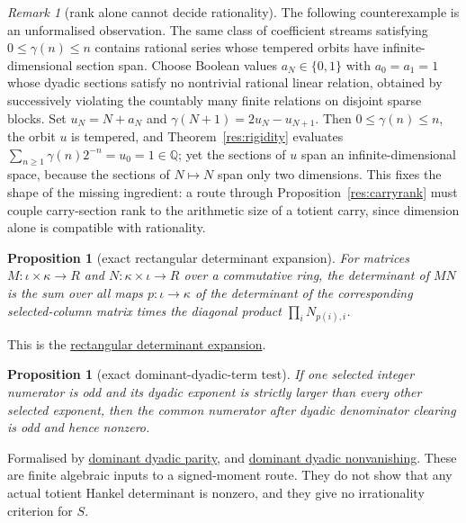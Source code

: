 \documentclass[11pt]{article}
\newcommand{\commit}{ebc98ee71f6819bd9fe344a0bb343542c604e533}
\newcommand{\repobase}{https://github.com/wcook04/plectis-lean-erdos249-257/blob/\commit}
\newcommand{\PK}{Erdos249257}
\newcommand{\lword}[4]{\href{\repobase/\PK/#1\#L#2}{#4}}
\newtheorem{proposition}[theorem]{Proposition}
\theoremstyle{definition}
\theoremstyle{remark}
\newtheorem*{remark}{Remark}
\newcommand{\Q}{\mathbb{Q}}
\begin{document}
{\begin{remark}[rank alone cannot decide rationality]
The following counterexample is an unformalised observation.  The same class
of coefficient streams satisfying $0\leq\gamma(n)\leq n$ contains rational
series whose tempered orbits have
infinite-dimensional section span.  Choose Boolean values
\(a_N\in\{0,1\}\) with \(a_0=a_1=1\) whose dyadic sections satisfy no
nontrivial rational linear relation, obtained by successively violating the
countably many finite relations on disjoint sparse blocks.  Set
\(u_N=N+a_N\) and \(\gamma(N+1)=2u_N-u_{N+1}\).  Then
\(0\le\gamma(n)\le n\), the orbit \(u\) is tempered, and
Theorem~\ref{res:rigidity} evaluates
\(\sum_{n\ge1}\gamma(n)2^{-n}=u_0=1\in\Q\); yet the sections of \(u\) span
an infinite-dimensional space, because the sections of \(N\mapsto N\) span
only two dimensions.  This fixes the shape of the missing ingredient: a route through
Proposition~\ref{res:carryrank} must couple carry-section rank to the
arithmetic size of a totient carry, since dimension alone is compatible
with rationality.
\end{remark}

\begin{proposition}[exact rectangular determinant expansion]\label{res:signedmoment}
For matrices $M:\iota\times\kappa\to R$ and
$N:\kappa\times\iota\to R$ over a commutative ring, the determinant of
$MN$ is the sum over all maps $p:\iota\to\kappa$ of the determinant of the
corresponding selected-column matrix times the diagonal product
$\prod_i N_{p(i),i}$.
\end{proposition}
\noindent This is the
\lword{SignedQMomentObstruction.lean}{28}{det_mul_rectangular}{rectangular determinant expansion}.

\begin{proposition}[exact dominant-dyadic-term test]\label{res:dominantdyadic}
If one selected integer numerator is odd and its dyadic exponent is strictly
larger than every other selected exponent, then the common numerator after
dyadic denominator clearing is odd and hence nonzero.
\end{proposition}
\noindent Formalised by
\lword{SignedQMomentObstruction.lean}{77}{scaled_dyadic_sum_odd}{dominant dyadic parity}, and
\lword{SignedQMomentObstruction.lean}{95}{scaled_dyadic_sum_ne_zero}{dominant dyadic nonvanishing}.
These are finite algebraic inputs to a signed-moment route.  They do not show
that any actual totient Hankel determinant is nonzero, and they give no
irrationality criterion for $S$.

}
\end{document}
